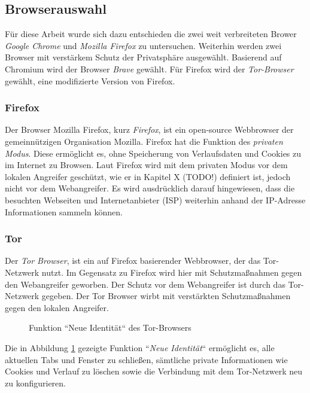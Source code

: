 \subsection{Browserauswahl}
\label{section:methodik-vorbereitung-browserauswahl}
Für diese Arbeit wurde sich dazu entschieden die zwei weit verbreiteten Brower \textit{Google Chrome} und \textit{Mozilla Firefox} zu untersuchen.
Weiterhin werden zwei Browser mit verstärkem Schutz der Privatsphäre ausgewählt.
Basierend auf Chromium wird der Browser \textit{Brave} gewählt.
Für Firefox wird der \textit{Tor-Browser} gewählt, eine modifizierte Version von Firefox.

\subsubsection*{Firefox}
\label{subsubsection:methodik-vorbereitung-browserauswahl-firefox}
Der Browser Mozilla Firefox, kurz \textit{Firefox}, ist ein open-source Webbrowser der gemeinnützigen Organisation Mozilla. 
Firefox hat die Funktion des \textit{privaten Modus}. Diese ermöglicht es, ohne Speicherung von Verlaufsdaten und Cookies zu im Internet zu Browsen.
Laut Firefox wird mit dem privaten Modus vor dem lokalen Angreifer geschützt, wie er in Kapitel X (TODO!) definiert ist, jedoch nicht vor dem Webangreifer.
Es wird ausdrücklich darauf hingewiesen, dass die besuchten Webseiten und Internetanbieter (ISP) weiterhin anhand der IP-Adresse Informationen sammeln können.


\subsubsection*{Tor}
\label{subsubsection:methodik-vorbereitung-browserauswahl-tor}
Der \textit{Tor Browser}, ist ein auf Firefox basierender Webbrowser, der das Tor-Netzwerk nutzt.
Im Gegensatz zu Firefox wird hier mit Schutzmaßnahmen gegen den Webangreifer geworben.
Der Schutz vor dem Webangreifer ist durch das Tor-Netzwerk gegeben.
Der Tor Browser wirbt mit verstärkten Schutzmaßnahmen gegen den lokalen Angreifer.
\begin{figure}[h!]
	\label{img:tor-new-identity}
	\caption{Funktion ``Neue Identität`` des Tor-Browsers}
\end{figure}
Die in Abbildung \ref{img:tor-new-identity} gezeigte Funktion ``\textit{Neue Identität}`` ermöglicht es, alle aktuellen Tabs und Fenster zu schließen, sämtliche private Informationen wie Cookies und Verlauf zu löschen sowie die Verbindung mit dem Tor-Netzwerk neu zu konfigurieren.

